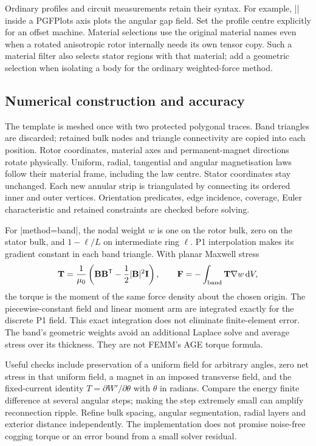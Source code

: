 Ordinary profiles and circuit measurements retain their syntax. For example,
|\femmplot[profile=gap-30,component=By,abscissa=angle]| inside a PGFPlots axis
plots the angular gap field. Set the profile centre explicitly for an offset
machine. Material selections use the original material names even when a
rotated anisotropic rotor internally needs its own tensor copy. Such a material
filter also selects stator regions with that material; add a geometric selection
when isolating a body for the ordinary weighted-force method.

\subsection{Numerical construction and accuracy}
The template is meshed once with two protected polygonal traces. Band triangles
are discarded; retained bulk nodes and triangle connectivity are copied into
each position. Rotor coordinates, material axes and permanent-magnet directions
rotate physically. Uniform, radial, tangential and angular magnetisation laws
follow their material frame, including the law centre. Stator coordinates stay
unchanged. Each new annular strip is triangulated by connecting its ordered
inner and outer vertices. Orientation predicates, edge incidence, coverage,
Euler characteristic and retained constraints are checked before solving.

For |method=band|, the nodal weight $w$ is one on the rotor bulk, zero on the
stator bulk, and $1-\ell/L$ on intermediate ring $\ell$. P1 interpolation makes
its gradient constant in each band triangle. With planar Maxwell stress
\[
 \mathbf T=\frac1{\mu_0}\left(\mathbf B\mathbf B^{\mathsf T}
             -\frac12|\mathbf B|^2\mathbf I\right),\qquad
 \mathbf F=-\int_{\rm band}\mathbf T\nabla w\,\mathrm dV,
\]
the torque is the moment of the same force density about the chosen origin.
The piecewise-constant field and linear moment arm are integrated exactly for
the discrete P1 field. This exact integration does not eliminate finite-element
error. The band's geometric weights avoid an additional Laplace solve and
average stress over its thickness. They are not FEMM's AGE torque formula.

Useful checks include preservation of a uniform field for arbitrary angles,
zero net stress in that uniform field, a magnet in an imposed transverse field,
and the fixed-current identity
$T=\partial W'/\partial\theta$ with $\theta$ in radians. Compare the energy
finite difference at several angular steps; making the step extremely small
can amplify reconnection ripple. Refine bulk spacing, angular segmentation,
radial layers and exterior distance independently. The implementation does not
promise noise-free cogging torque or an error bound from a small solver residual.

